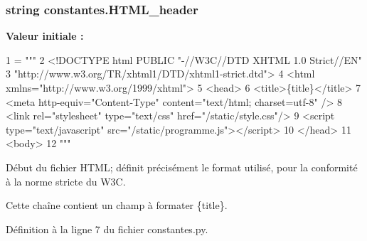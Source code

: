 \hypertarget{namespaceconstantes_a04524e30f424889c8a4407e02f93755f}{
\subsubsection[{H\-T\-M\-L\-\_\-header}]{\setlength{\rightskip}{0pt plus 5cm}string constantes.\-H\-T\-M\-L\-\_\-header}}\label{namespaceconstantes_a04524e30f424889c8a4407e02f93755f}
{\bfseries Valeur initiale \-:}
\begin{DoxyCode}
1 = \textcolor{stringliteral}{"""}
2 \textcolor{stringliteral}{<!DOCTYPE html PUBLIC "-//W3C//DTD XHTML 1.0 Strict//EN"}
3 \textcolor{stringliteral}{        "http://www.w3.org/TR/xhtml1/DTD/xhtml1-strict.dtd">}
4 \textcolor{stringliteral}{<html xmlns="http://www.w3.org/1999/xhtml">}
5 \textcolor{stringliteral}{<head>}
6 \textcolor{stringliteral}{<title>\{title\}</title>}
7 \textcolor{stringliteral}{<meta http-equiv="Content-Type" content="text/html; charset=utf-8" />}
8 \textcolor{stringliteral}{<link rel="stylesheet" type="text/css" href="/static/style.css"/>}
9 \textcolor{stringliteral}{<script type="text/javascript" src="/static/programme.js"></script>}
10 \textcolor{stringliteral}{</head>}
11 \textcolor{stringliteral}{<body>}
12 \textcolor{stringliteral}{"""}
\end{DoxyCode}


Début du fichier H\-T\-M\-L; définit précisément le format utilisé, pour la conformité à la norme stricte du W3\-C. 

Cette chaîne contient un champ à formater \{title\}. 

Définition à la ligne 7 du fichier constantes.\-py.

